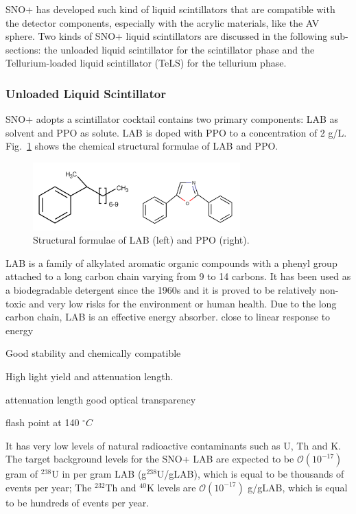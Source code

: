 SNO+ has developed such kind of liquid scintillators that are compatible with the detector components, especially with the acrylic materials, like the AV sphere. Two kinds of SNO+ liquid scintillators are discussed in the following sub-sections: the unloaded liquid scintillator for the scintillator phase and the Tellurium-loaded liquid scintillator (TeLS) for the tellurium phase.

\subsubsection{Unloaded Liquid Scintillator}\label{sect:LS_SNO+}
SNO+ adopts a scintillator cocktail contains two primary components: LAB as solvent and PPO as solute. LAB is doped with PPO to a concentration of 2 g/L. Fig.~\ref{labppo-molecule} shows the chemical structural formulae of LAB and PPO\cite{scintillatorPaper}.
\begin{figure}[!htb]
	\centering
	\includegraphics[width=8cm]{lab-ppo-molecule.png}
	\caption{Structural formulae of LAB (left) and PPO (right).}
	\label{labppo-molecule}
\end{figure}

LAB is a family of alkylated aromatic organic compounds with a phenyl group attached to a long carbon chain varying from 9 to 14 carbons\cite{wiki_LAB, scintillatorPaper}. It has been used as a biodegradable detergent since the 1960s and it is proved to be relatively non-toxic and very low risks for the environment or human health\cite{wiki_LAB}. Due to the long carbon chain, LAB is an effective energy absorber.
close to linear response to energy


Good stability and chemically compatible




High light yield and attenuation length.


attenuation length
good optical transparency 

 flash point at 140 $^\circ C$

 It has very low levels of natural radioactive contaminants such as U, Th and K.
The target background levels for the SNO+ LAB are expected to be $\mathcal O(10^{-17})$ gram of $^{238}$U in per gram LAB (g$^{238}$U/gLAB), which is equal to be thousands of events per year;
The $^{232}$Th and $^{40}$K levels are $\mathcal O(10^{-17})$ g/gLAB, which is equal to be hundreds of events per year\cite{markchen_bkg}.



